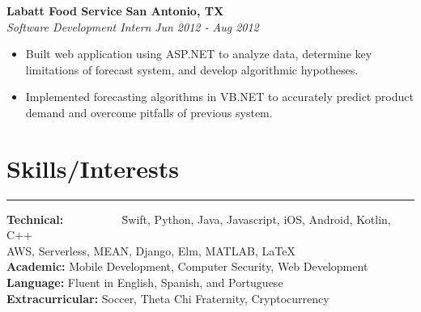 \documentclass{res}
\begin{document}
\begin{resume}
{\bf Labatt Food Service} \hfill {\bf San Antonio, TX} \\
{\textit {Software Development Intern}} \hfill {\textit {Jun 2012 - Aug 2012}} 
\begin{itemize}
\renewcommand{\labelitemi}{\ding{117}}
\itemsep -2pt  
\item Built web application using ASP.NET to analyze data, determine key limitations of
	forecast system, and develop algorithmic hypotheses.
\item Implemented forecasting algorithms in VB.NET to accurately predict product demand
	and overcome pitfalls of previous system.
\end{itemize}

\vspace{-9pt}

\section{{\large Skills/Interests}}

\vspace{-10pt}

\noindent\rule{\resumewidth}{0.4pt}  
\vspace{-30pt}
\begin{tabbing}
{\bf Technical: } ~~~~~~~~~ \= Swift, Python, Java, Javascript, iOS, Android, Kotlin, C++ \\
\> AWS, Serverless, MEAN, Django, Elm, MATLAB, \LaTeX \\
{\bf Academic: } \>  Mobile Development, Computer Security, Web Development \\
{\bf Language: } \> Fluent in English, Spanish, and Portuguese\\
{\bf Extracurricular: } \> Soccer, Theta Chi Fraternity, Cryptocurrency \\
\end{tabbing}

\end{resume} 
\end{document}
